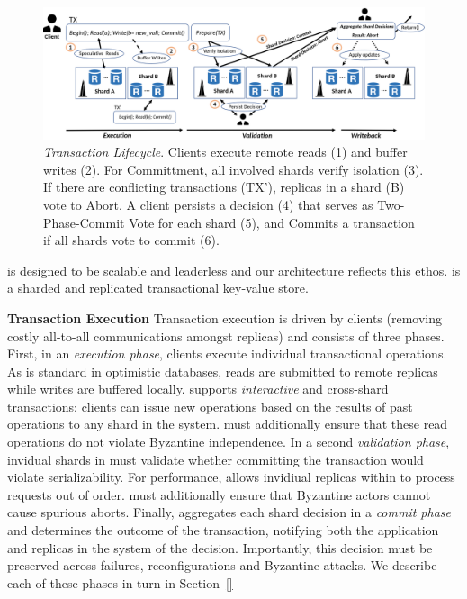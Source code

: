 
\begin{figure}[!th]
\begin{center}
\includegraphics[width= \textwidth]{./figures/Archi.png}
\end{center}
\caption{{\em Transaction Lifecycle}. Clients execute remote reads (1) and buffer writes (2). For Committment, all involved shards verify isolation (3). If there are conflicting transactions (TX'), replicas in a shard (B) vote to Abort. A client persists a decision (4) that serves as Two-Phase-Commit Vote for each shard (5), and Commits a transaction if all shards vote to commit (6).}
\label{fig:Figure1}
\end{figure}
 

\sys is designed to be scalable and leaderless and our architecture reflects this ethos. \sys{} is a sharded and replicated transactional key-value store.

\par \textbf{Transaction Execution} Transaction execution is driven by clients (removing costly all-to-all
communications amongst replicas) and consists of three phases. First, in an \textit{execution phase}, clients execute individual transactional operations. As is standard in optimistic
databases, reads are submitted to remote replicas while writes are buffered locally. \sys{} supports \textit{interactive} and cross-shard transactions: clients
can issue new operations based on the results of past operations to any shard in the system. \sys{} must additionally ensure that these read operations do not violate
Byzantine independence. In a second \textit{validation phase}, invidual shards in \sys{} must validate whether committing the transaction would violate serializability. For performance,
\sys{} allows invidiual replicas within to process requests out of order. \sys{} must additionally ensure that Byzantine actors cannot cause spurious aborts. Finally, \sys{} aggregates each shard decision in a \textit{commit phase} and determines the outcome of the transaction, notifying both the application and replicas in the system of the decision. Importantly, this decision must be preserved across failures, reconfigurations and Byzantine attacks. We describe each of these phases in turn in Section~\ref{}

